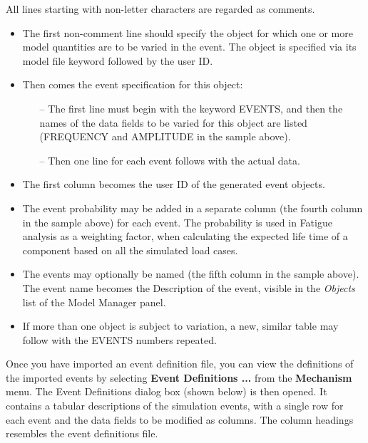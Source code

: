 {\noindent
All lines starting with non-letter characters are regarded as comments.

\begin{itemize}
\item
  The first non-comment line should specify the object for which one or more
  model quantities are to be varied in the event.
  The object is specified via its model file keyword followed by the user ID.
\item
  Then comes the event specification for this object:
  \begin{itemize}
  \item[--]
    The first line must begin with the keyword EVENTS, and then the names of the
    data fields to be varied for this object are listed (FREQUENCY and AMPLITUDE
    in the sample above).
  \item[--]
    Then one line for each event follows with the actual data.
    \end{itemize}
\item
  The first column becomes the user ID of the generated event objects.
\item
  The event probability may be added in a separate column (the fourth column in
  the sample above) for each event. The probability is used in Fatigue analysis
  as a weighting factor, when calculating the expected life time of a component
  based on all the simulated load cases.
\item
  The events may optionally be named (the fifth column in the sample above).
  The event name becomes the Description of the event, visible in the
  {\sl Objects} list of the Model Manager panel.
\item
  If more than one object is subject to variation, a new, similar table may
  follow with the EVENTS numbers repeated.
\end{itemize}




Once you have imported an event definition file, you can view the definitions of
the imported events by selecting \textbf{Event Definitions ...} from the
\textbf{Mechanism} menu. The Event Definitions dialog box (shown below) is then
opened. It contains a tabular descriptions of the simulation events,
with a single row for each event and the data fields to be modified as columns.
The column headings resembles the event definitions file.

}
